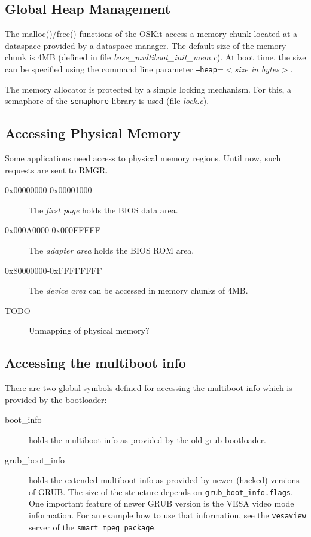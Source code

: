 \documentclass[twocolumn,10pt]{article}
\begin{document}
\subsection{Global Heap Management}
The malloc()/free() functions of the OSKit access a memory chunk
located at a dataspace provided by a dataspace manager. The default
size of the memory chunk is 4MB (defined in file 
\textsl{base\_multiboot\_init\_mem.c}). At boot time, the size can be
specified using the command line parameter
\texttt{--heap}=\textsl{$<$size in bytes$>$}.

The memory allocator is protected by a simple locking mechanism.
For this, a semaphore of the \texttt{semaphore} library is used
(file \textsl{lock.c}).


\subsection{Accessing Physical Memory}
Some applications need access to physical memory regions. Until now,
such requests are sent to RMGR.

\begin{description}
\item[0x00000000-0x00001000] The \textsl{first page} holds the BIOS
  data area.
\item[0x000A0000-0x000FFFFF] The \textsl{adapter area} holds the BIOS
  ROM area.
\item[0x80000000-0xFFFFFFFF] The \textsl{device area} can be accessed
  in memory chunks of 4MB.
\item[TODO] Unmapping of physical memory?
\end{description}

\subsection{Accessing the multiboot info}
There are two global symbols defined for accessing the multiboot info
which is provided by the bootloader:

\begin{description}
\item[boot\_info] holds the multiboot info as provided by the
  old grub bootloader.

\item[grub\_boot\_info] holds the extended multiboot info as
  provided by newer (hacked) versions of GRUB. The size of the
  structure depends on \texttt{grub\_boot\_info.flags}. One important
  feature of newer GRUB version is the VESA video mode information.
  For an example how to use that information, see the \texttt{vesaview}
  server of the \texttt{smart\_mpeg package}.
\end{description}
\end{document}
